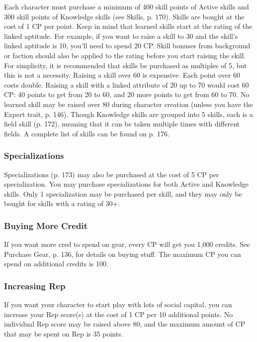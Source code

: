 Each character must purchase a minimum of 400 skill points of Active skills and 300 skill points of Knowledge skills (see Skills, p. 170). Skills are bought at the cost of 1 CP per point. Keep in mind that learned skills start at the rating of the linked aptitude. For example, if you want to raise a skill to 30 and the skill’s linked aptitude is 10, you’ll need to spend 20 CP. Skill bonuses from background or faction should also be applied to the rating before you start raising the skill. For simplicity, it is recommended that skills be purchased as multiples of 5, but this is not a necessity. Raising a skill over 60 is expensive. Each point over 60 costs double. Raising a skill with a linked attribute of 20 up to 70 would cost 60 CP: 40 points to get from 20 to 60, and 20 more points to get from 60 to 70. No learned skill may be raised over 80 during character creation (unless you have the Expert trait, p. 146). Though Knowledge skills are grouped into 5 skills, each is a field skill (p. 172), meaning that it can be taken multiple times with different fields. A complete list of skills can be found on p. 176. 

\subsubsection{Specializations} \label{sec:buying-specializations} 

Specializations (p. 173) may also be purchased at the cost of 5 CP per specialization. You may purchase specializations for both Active and Knowledge skills. Only 1 specialization may be purchased per skill, and they may only be bought for skills with a rating of 30+. 

\subsubsection{Buying More Credit} \label{sec:buying-credit} 

If you want more cred to spend on gear, every CP will get you 1,000 credits. See Purchase Gear, p. 136, for details on buying stuff. The maximum CP you can spend on additional credits is 100. 

\subsubsection{Increasing Rep} \label{sec:increasing-rep} 

If you want your character to start play with lots of social capital, you can increase your Rep score(s) at the cost of 1 CP per 10 additional points. No individual Rep score may be raised above 80, and the maximum amount of CP that may be spent on Rep is 35 points. 


